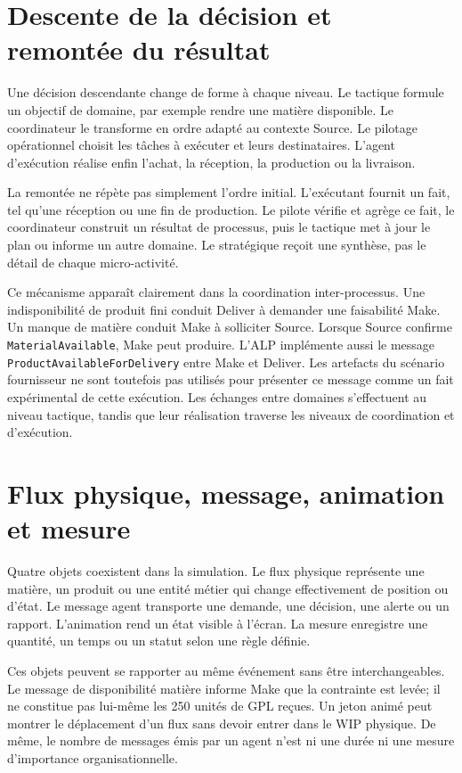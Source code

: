 \section{Descente de la décision et remontée du résultat}

Une décision descendante change de forme à chaque niveau. Le tactique formule un objectif de domaine, par exemple rendre une matière disponible. Le coordinateur le transforme en ordre adapté au contexte Source. Le pilotage opérationnel choisit les tâches à exécuter et leurs destinataires. L'agent d'exécution réalise enfin l'achat, la réception, la production ou la livraison.

La remontée ne répète pas simplement l'ordre initial. L'exécutant fournit un fait, tel qu'une réception ou une fin de production. Le pilote vérifie et agrège ce fait, le coordinateur construit un résultat de processus, puis le tactique met à jour le plan ou informe un autre domaine. Le stratégique reçoit une synthèse, pas le détail de chaque micro-activité.

Ce mécanisme apparaît clairement dans la coordination inter-processus. Une indisponibilité de produit fini conduit Deliver à demander une faisabilité Make. Un manque de matière conduit Make à solliciter Source. Lorsque Source confirme \texttt{MaterialAvailable}, Make peut produire. L'ALP implémente aussi le message \texttt{ProductAvailableForDelivery} entre Make et Deliver. Les artefacts du scénario fournisseur ne sont toutefois pas utilisés pour présenter ce message comme un fait expérimental de cette exécution. Les échanges entre domaines s'effectuent au niveau tactique, tandis que leur réalisation traverse les niveaux de coordination et d'exécution.

\section{Flux physique, message, animation et mesure}

Quatre objets coexistent dans la simulation. Le flux physique représente une matière, un produit ou une entité métier qui change effectivement de position ou d'état. Le message agent transporte une demande, une décision, une alerte ou un rapport. L'animation rend un état visible à l'écran. La mesure enregistre une quantité, un temps ou un statut selon une règle définie.

Ces objets peuvent se rapporter au même événement sans être interchangeables. Le message de disponibilité matière informe Make que la contrainte est levée; il ne constitue pas lui-même les 250 unités de GPL reçues. Un jeton animé peut montrer le déplacement d'un flux sans devoir entrer dans le WIP physique. De même, le nombre de messages émis par un agent n'est ni une durée ni une mesure d'importance organisationnelle.

